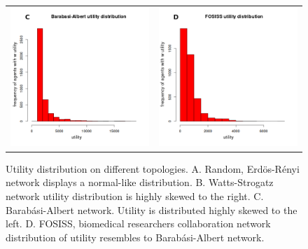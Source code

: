 \documentclass[11pt]{article}
\begin{document}
\begin{figure} [h!]
\begin{tabular}{cc}
\includegraphics[scale=0.28]{images/barabasi_fitness.png} & 
\includegraphics[scale=0.28]{images/fosiss_fitness.png}
\end{tabular}
\caption{Utility distribution on different topologies. A. Random,
  Erd\"{o}s-R\'enyi network displays a normal-like
  distribution. B. Watts-Strogatz network utility distribution is highly skewed
  to the right. C. Barab\'asi-Albert network. Utility is distributed highly
  skewed to the left. D. FOSISS, biomedical researchers collaboration network
  distribution of utility resembles to Barab\'asi-Albert
  network.}\label{histo_fitness} 
\end{figure}
\end{document}

